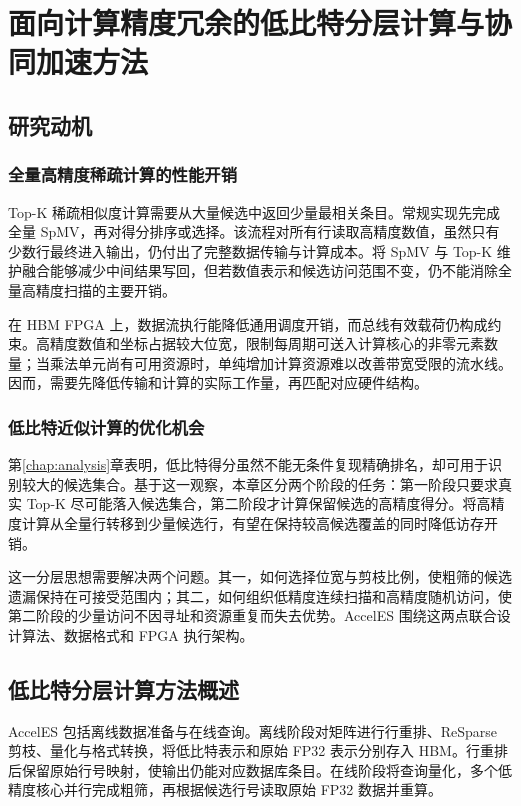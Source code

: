 \chapter{面向计算精度冗余的低比特分层计算与协同加速方法}\label{chap:acceles}
\section{研究动机}
\subsection{全量高精度稀疏计算的性能开销}
Top-K 稀疏相似度计算需要从大量候选中返回少量最相关条目。常规实现先完成全量 SpMV，再对得分排序或选择。该流程对所有行读取高精度数值，虽然只有少数行最终进入输出，仍付出了完整数据传输与计算成本。将 SpMV 与 Top-K 维护融合能够减少中间结果写回，但若数值表示和候选访问范围不变，仍不能消除全量高精度扫描的主要开销。

在 HBM FPGA 上，数据流执行能降低通用调度开销，而总线有效载荷仍构成约束。高精度数值和坐标占据较大位宽，限制每周期可送入计算核心的非零元素数量；当乘法单元尚有可用资源时，单纯增加计算资源难以改善带宽受限的流水线。因而，需要先降低传输和计算的实际工作量，再匹配对应硬件结构。

\subsection{低比特近似计算的优化机会}
第\ref{chap:analysis}章表明，低比特得分虽然不能无条件复现精确排名，却可用于识别较大的候选集合。基于这一观察，本章区分两个阶段的任务：第一阶段只要求真实 Top-K 尽可能落入候选集合，第二阶段才计算保留候选的高精度得分。将高精度计算从全量行转移到少量候选行，有望在保持较高候选覆盖的同时降低访存开销。

这一分层思想需要解决两个问题。其一，如何选择位宽与剪枝比例，使粗筛的候选遗漏保持在可接受范围内；其二，如何组织低精度连续扫描和高精度随机访问，使第二阶段的少量访问不因寻址和资源重复而失去优势。AccelES 围绕这两点联合设计算法、数据格式和 FPGA 执行架构\cite{jqzhai2025AccelES}。

\section{低比特分层计算方法概述}
AccelES 包括离线数据准备与在线查询。离线阶段对矩阵进行行重排、ReSparse 剪枝、量化与格式转换，将低比特表示和原始 FP32 表示分别存入 HBM。行重排后保留原始行号映射，使输出仍能对应数据库条目。在线阶段将查询量化，多个低精度核心并行完成粗筛，再根据候选行号读取原始 FP32 数据并重算。


